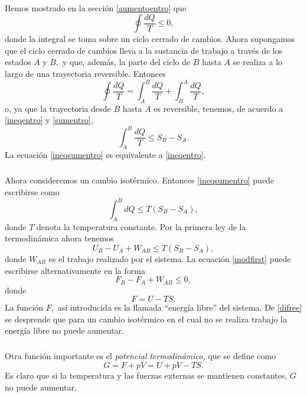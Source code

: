 \documentclass{article}
\theoremstyle{definition} \newtheorem{defi}{Definici\'on}
\theoremstyle{definition} \newtheorem{teo}{Teorema}
\theoremstyle{definition} \newtheorem{cor}{Corolario}
\begin{document}
\paragraph{}
Hemos mostrado en la secci\'on \ref{aumentoentro} que
\begin{equation}\label{ineqentro}
\oint \frac{dQ}{T}\leq 0,
\end{equation}
donde la integral se toma sobre un ciclo cerrado de cambios. Ahora supongamos que el ciclo cerrado de cambios lleva a la sustancia de trabajo a trav\'es de los estados $A$ y $B,$ y que, adem\'as, la parte del ciclo de $B$ hasta $A$ se realiza a lo largo de una trayectoria reversible. Entonces
\begin{equation}\label{sumentro}
\oint \frac{dQ}{T}=\int^B_A\frac{dQ}{T}+\int^A_B\frac{dQ}{T},
\end{equation}
o, ya que la trayectoria desde $B$ hasta $A$ es reversible, tenemos, de acuerdo a \eqref{ineqentro} y \eqref{sumentro},
\begin{equation}\label{ineqsumentro}
\int^B_A \frac{dQ}{T}\leq S_B-S_A.
\end{equation}
La ecuaci\'on \eqref{ineqsumentro} es equivalente a \eqref{ineqentro}.
\subparagraph{}
Ahora consideremos un cambio isot\'ermico. Entonces \eqref{ineqsumentro} puede escribirse como
\begin{equation}
\int^B_AdQ\leq T(S_B-S_A),
\end{equation}
donde $T$ denota la temperatura constante. Por la primera ley de la termodin\'amica ahora tenemos
\begin{equation}\label{modfirst}
U_B-U_A+W_{AB}\leq T(S_B-S_A),
\end{equation}
donde $W_{AB}$ es el trabajo realizado por el sistema. La ecuaci\'on \eqref{modfirst} puede escribirse alternativamente en la forma
\begin{equation}\label{difree}
F_B-F_A+W_{AB}\leq 0,
\end{equation}
donde
\begin{equation}\label{freener}
F=U-TS.
\end{equation}
La funci\'on $F, $ as\'i introducida es la llamada ``energ\'ia libre'' del sistema. De \eqref{difree} se desprende que para un cambio isot\'ermico en el cual no se realiza trabajo la energ\'ia libre no puede aumentar.
\subparagraph{}
Otra funci\'on importante es el \emph{potencial termodin\'amico,} que se define como
\begin{equation}
G=F+pV=U+pV-TS.
\end{equation}
Es claro que si la temperatura y las fuerzas externas se mantienen constantes, $G$ no puede aumentar.
\end{document}
